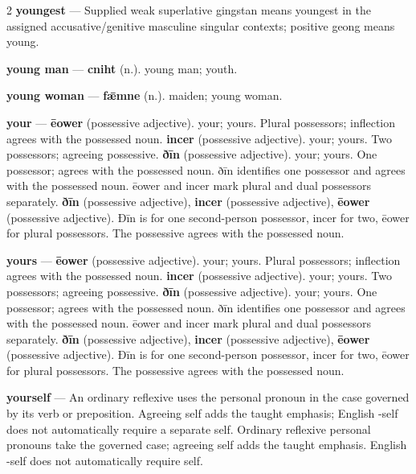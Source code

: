 \begin{multicols}{2}
\textbf{youngest} — Supplied weak superlative gingstan means youngest in the assigned accusative/genitive masculine singular contexts; positive geong means young.\par
\textbf{young man} — \textbf{cniht} (n.). young man; youth.\par
\textbf{young woman} — \textbf{fǣmne} (n.). maiden; young woman.\par
\textbf{your} — \textbf{ēower} (possessive adjective). your; yours. Plural possessors; inflection agrees with the possessed noun. \textbf{incer} (possessive adjective). your; yours. Two possessors; agreeing possessive. \textbf{ðīn} (possessive adjective). your; yours. One possessor; agrees with the possessed noun. ðīn identifies one possessor and agrees with the possessed noun. ēower and incer mark plural and dual possessors separately. \textbf{ðīn} (possessive adjective), \textbf{incer} (possessive adjective), \textbf{ēower} (possessive adjective). Ðīn is for one second-person possessor, incer for two, ēower for plural possessors. The possessive agrees with the possessed noun.\par
\textbf{yours} — \textbf{ēower} (possessive adjective). your; yours. Plural possessors; inflection agrees with the possessed noun. \textbf{incer} (possessive adjective). your; yours. Two possessors; agreeing possessive. \textbf{ðīn} (possessive adjective). your; yours. One possessor; agrees with the possessed noun. ðīn identifies one possessor and agrees with the possessed noun. ēower and incer mark plural and dual possessors separately. \textbf{ðīn} (possessive adjective), \textbf{incer} (possessive adjective), \textbf{ēower} (possessive adjective). Ðīn is for one second-person possessor, incer for two, ēower for plural possessors. The possessive agrees with the possessed noun.\par
\textbf{yourself} — An ordinary reflexive uses the personal pronoun in the case governed by its verb or preposition. Agreeing self adds the taught emphasis; English -self does not automatically require a separate self. Ordinary reflexive personal pronouns take the governed case; agreeing self adds the taught emphasis. English -self does not automatically require self.\par

\end{multicols}
